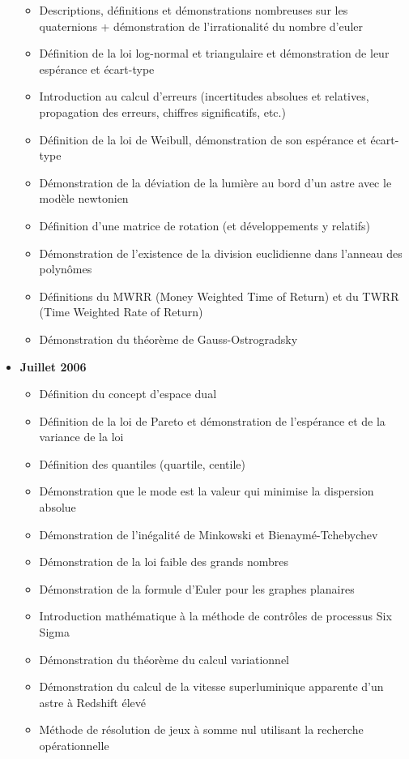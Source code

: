 \begin{itemize}
\begin{itemize}[noitemsep]
				\item Descriptions, définitions et démonstrations nombreuses sur les quaternions + démonstration de l'irrationalité du nombre d'euler
				\item Définition de la loi log-normal et triangulaire et démonstration de leur espérance et écart-type
				\item Introduction au calcul d'erreurs (incertitudes absolues et relatives, propagation des erreurs, chiffres significatifs, etc.)
				\item Définition de la loi de Weibull, démonstration de son espérance et écart-type
				\item Démonstration de la déviation de la lumière au bord d'un astre avec le modèle newtonien
				\item Définition d'une matrice de rotation (et développements y relatifs)
				\item Démonstration de l'existence de la division euclidienne dans l'anneau des polynômes
				\item Définitions du MWRR (Money Weighted Time of Return) et du TWRR (Time Weighted Rate of Return)
				\item Démonstration du théorème de Gauss-Ostrogradsky 
			\end{itemize}
		\item \textbf{Juillet 2006}
			\begin{itemize}[noitemsep]
				\item Définition du concept d'espace dual
				\item Définition de la loi de Pareto et démonstration de l'espérance et de la variance de la loi
				\item Définition des quantiles (quartile, centile)
				\item Démonstration que le mode est la valeur qui minimise la dispersion absolue
				\item Démonstration de l'inégalité de Minkowski et Bienaymé-Tchebychev
				\item Démonstration de la loi faible des grands nombres
				\item Démonstration de la formule d'Euler pour les graphes planaires
				\item Introduction mathématique à la méthode de contrôles de processus Six Sigma
				\item Démonstration du théorème du calcul variationnel
				\item Démonstration du calcul de la vitesse superluminique apparente d'un astre à Redshift élevé
				\item Méthode de résolution de jeux à somme nul utilisant la recherche opérationnelle

\end{itemize}
\end{itemize}
